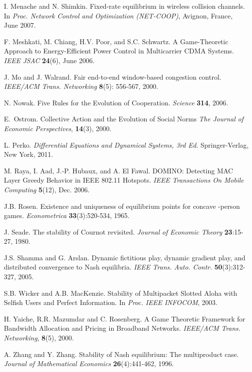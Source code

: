 \documentclass[12pt,onecolumn,draftcls]{IEEEtran}
\begin{document}
\begin{thebibliography}{9}
I. Menache and N. Shimkin. 
Fixed-rate equilibrium in wireless collision channels.
In {\em Proc. Network Control and Optimization (NET-COOP)}, Avignon,
France, June 2007.

F. Meshkati, M. Chiang, H.V. Poor, and S.C. Schwartz.
A Game-Theoretic Approach to Energy-Efficient
Power Control in Multicarrier CDMA Systems.
{\em IEEE JSAC} {\bf 24}(6), June 2006.

J. Mo and J. Walrand.
Fair end-to-end window-based congestion control.
{\em IEEE/ACM Trans. Networking} {\bf 8}(5): 
556-567, 2000.



N. Nowak. 
Five Rules for the Evolution of Cooperation.
{\em Science} {\bf 314}, 2006.



E.~Ostrom.
Collective Action and the Evolution of Social Norms
{\em The Journal of Economic Perspectives}, 
{\bf 14}(3), 2000.

L. Perko.
{\em Differential Equations and Dynamical Systems, 3rd Ed.}
Springer-Verlag, New York, 2011.




M. Raya, I. Aad, J.-P. Hubaux, and A. El Fawal.
DOMINO: Detecting MAC Layer Greedy Behavior in IEEE 802.11 Hotspots.
{\em IEEE Transactions On Mobile Computing}
{\bf 5}(12), Dec. 2006.

J.B. Rosen. Existence and uniqueness of equilibrium points for concave
-person games. {\em Econometrica} {\bf 33}(3):520-534, 1965.









J. Seade.
The stability of Cournot revisited.
{\em Journal of Economic Theory}
{\bf 23}:15-27, 1980.

J.S. Shamma and G. Arslan. 
Dynamic fictitious play, dynamic gradient play, and distributed 
convergence to Nash equilibria. 
{\em IEEE Trans. Auto. Contr.} {\bf 50}(3):312-327, 2005.



S.B. Wicker  and A.B. MacKenzie.
Stability of Multipacket Slotted Aloha with Selfish Users and Perfect 
Information.
In {\em Proc. IEEE INFOCOM}, 2003.







H. Yaiche, R.R. Mazumdar and C. Rosenberg.
A Game Theoretic Framework for Bandwidth
Allocation and Pricing in Broadband Networks.
{\em IEEE/ACM Trans. Networking}, {\bf 8}(5), 2000.

A. Zhang and Y. Zhang.
Stability of Nash equilibrium: The multiproduct case.
  {\em Journal of Mathematical Economics}
{\bf 26}(4):441-462, 1996.
\end{thebibliography}
\end{document}
